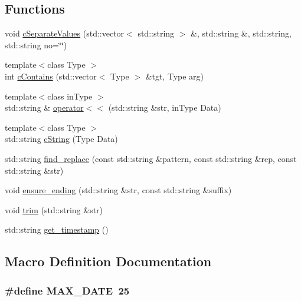 \subsection*{Functions}
\begin{DoxyCompactItemize}
\item 
void \hyperlink{utilities_8hh_a2f854ac6ac93c0790fd5a5c0b9715a74}{c\-Separate\-Values} (std\-::vector$<$ std\-::string $>$ \&, std\-::string \&, std\-::string, std\-::string no=\char`\"{}\char`\"{})
\item 
{\footnotesize template$<$class Type $>$ }\\int \hyperlink{utilities_8hh_ac50055ad10ac4af6192feb9ea7fa5e00}{c\-Contains} (std\-::vector$<$ Type $>$ \&tgt, Type arg)
\item 
{\footnotesize template$<$class in\-Type $>$ }\\std\-::string \& \hyperlink{utilities_8hh_a0f99b3edfdcfe1466f26eea911b4c7d0}{operator$<$$<$} (std\-::string \&str, in\-Type Data)
\item 
{\footnotesize template$<$class Type $>$ }\\std\-::string \hyperlink{utilities_8hh_af0192c9d10463d2686dc99fde19913e6}{c\-String} (Type Data)
\item 
std\-::string \hyperlink{utilities_8hh_a2a1d823bc6c237b6c1dfccfe9f781394}{find\-\_\-replace} (const std\-::string \&pattern, const std\-::string \&rep, const std\-::string \&str)
\item 
void \hyperlink{utilities_8hh_a5bcdfdc95f2e3d46749414d783bc6d42}{ensure\-\_\-ending} (std\-::string \&str, const std\-::string \&suffix)
\item 
void \hyperlink{utilities_8hh_a83375b89f8b135c348ba5bea0c847da0}{trim} (std\-::string \&str)
\item 
std\-::string \hyperlink{utilities_8hh_a3f3b864aa1926634aeab0d037cefc11d}{get\-\_\-timestamp} ()
\end{DoxyCompactItemize}


\subsection{Macro Definition Documentation}
\hypertarget{utilities_8hh_ab2854f198e119d1843f14002a2621aa7}{
\subsubsection[{M\-A\-X\-\_\-\-D\-A\-T\-E}]{\setlength{\rightskip}{0pt plus 5cm}\#define M\-A\-X\-\_\-\-D\-A\-T\-E~25}}\label{utilities_8hh_ab2854f198e119d1843f14002a2621aa7}


